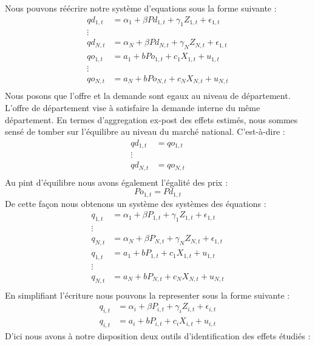 \documentclass[11pt,]{article}
\begin{document}
Nous pouvons réécrire notre système d'equations sous la forme suivante :
\begin{align*}
  qd_{1,t} & = \alpha_{1} + \beta Pd_{1,t} + \gamma_{1} Z_{1,t} + \epsilon_{1,t}  \\
  \vdots \\ 
  qd_{N,t} & = \alpha_{N} + \beta Pd_{N,t} + \gamma_{N} Z_{N,t} + \epsilon_{1,t}  \\
  qo_{1,t} & = a_1 + b Po_{1,t} + c_1 X_{1,t} + u_{1,t} \\ 
  \vdots \\ 
  qo_{N,t} & = a_N + b Po_{N,t} + c_N X_{N,t} + u_{N,t} \\
\end{align*} Nous posons que l'offre et la demande sont egaux au niveau
de département. L'offre de département vise à satisfaire la demande
interne du même département. En termes d'aggregation ex-post des effets
estimés, nous sommes sensé de tomber sur l'équilibre au niveau du marché
national. C'est-à-dire : \begin{align*}
  qd_{1,t} & = qo_{1,t} \\
  \vdots \\ 
  qd_{N,t} & = qo_{N,t} \\
\end{align*} Au pint d'équilibre nous avons également l'égalité des prix
: \begin{equation*}
  Po_{1,t} = Pd_{1,t}
\end{equation*} De cette façon nous obtenons un système des systèmes des
équations : \begin{align*}
  q_{1,t} & = \alpha_{1} + \beta P_{1,t} + \gamma_{1} Z_{1,t} + \epsilon_{1,t}  \\
  \vdots \\ 
  q_{N,t} & = \alpha_{N} + \beta P_{N,t} + \gamma_{N} Z_{N,t} + \epsilon_{1,t}  \\
  q_{1,t} & = a_1 + b P_{1,t} + c_1 X_{1,t} + u_{1,t} \\ 
  \vdots \\ 
  q_{N,t} & = a_N + b P_{N,t} + c_N X_{N,t} + u_{N,t} \\
\end{align*} En simplifiant l'écriture nous pouvons la representer sous
la forme suivante : \begin{align*}
  q_{i,t} & = \alpha_{i} + \beta P_{i,t} + \gamma_{i} Z_{i,t} + \epsilon_{i,t} \\
  q_{i,t} & = a_i + b P_{i,t} + c_i X_{i,t} + u_{i,t}
\end{align*} D'ici nous avons à notre disposition deux outils
d'identification des effets étudiés :
\end{document}
